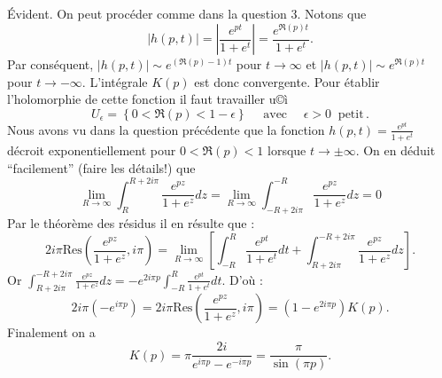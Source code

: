{\begin{enumerate}
{\'Evident.
On peut proc\'eder comme dans la question 3. Notons que
$$|h(p,t)| =\left| \frac{e^{pt}}{1+e^t}\right|=\frac{e^{\Re (p) t}}{1+e^t}.$$
Par cons\'equent, $|h(p,t) | \sim e^{(\Re (p) -1)t}$ pour $t\to\infty$ et
$|h(p,t) | \sim e^{\Re (p) t}$ pour $t\to -\infty$. L'int\'egrale $K(p)$
est donc convergente. Pour \'etablir l'holomorphie de cette fonction il faut travailler
u©ì$$U_\epsilon =\left\{ 0< \Re (p) < 1-\epsilon \right\} \quad\text{ avec } \quad \epsilon >0 \; \; \text{petit}\, .$$
Nous avons vu dans la question pr\'ec\'edente que la fonction $h(p,t)=\frac{e^{pt}}{1+e^t}$
d\'ecroit exponentiellement pour $0< \Re (p) < 1$ lorsque $t\to \pm \infty$. On en d\'eduit
``facilement'' (faire les d\'etails!) que
$$\lim_{R\to\infty }\int_R^{R+2i\pi}\frac{e^{pz}}{1+e^z}dz = \lim_{R\to\infty }\int_{-R+2i\pi}^{-R}\frac{e^{pz}}{1+e^z}dz =0$$
Par le th\'eor\`eme des r\'esidus il en r\'esulte que :
$$2i\pi \mathrm{Res} \left(\frac{e^{pz}}{1+e^z} , i\pi \right)= \lim_{R\to\infty}
\left[ \int_{-R}^{R}\frac{e^{pt}}{1+e^t}dt+ \int_{R+2i\pi}^{-R+2i\pi}\frac{e^{pz}}{1+e^z}dz\right].$$
Or $\int_{R+2i\pi}^{-R+2i\pi}\frac{e^{pz}}{1+e^z}dz= -e^{2i\pi p}\int_{-R}^{R}\frac{e^{pt}}{1+e^t}dt$.
D'o\`u :
$$2i\pi \left( -e^{i\pi p }\right) = 2i\pi \mathrm{Res} \left(\frac{e^{pz}}{1+e^z} , i\pi \right)
=\left( 1-e^{2i\pi p}\right) K(p).$$
Finalement on a
$$K(p)=\pi \frac{2i}{e^{i\pi p}-e^{-i\pi p}} =\frac{\pi}{\sin (\pi p)}.$$
}
\end{enumerate}
}
